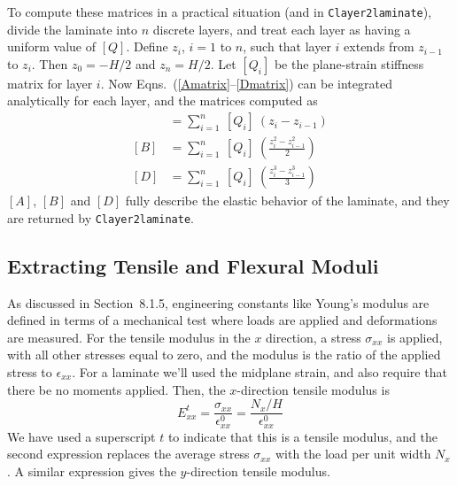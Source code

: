 \documentclass[11pt]{article}
\begin{document}
To compute these matrices in a practical situation (and in \texttt{Clayer2laminate}), divide the laminate into $n$ discrete layers, and treat each layer as having a uniform value of $[Q]$.  Define $z_i$, $i = 1$ to $n$, such that layer $i$ extends from $z_{i-1}$ to $z_{i}$.  Then $z_0 = -H/2$ and $z_n = H/2$.  Let $[Q_i]$ be the plane-strain stiffness matrix for layer $i$.  Now Eqns.~(\ref{Amatrix}--\ref{Dmatrix}) can be integrated analytically for each layer, and the matrices computed as
\begin{align}
     [A] &= \sum_{i=1}^n \: [Q_i] \: \left( z_i - z_{i-1} \right)  \label{Asum} \\
     [B] &= \sum_{i=1}^n  \: [Q_i] \: \left( \frac{z^2_i - z^2_{i-1}}{2} \right)  \label{Bsum}  \\
     [D] &= \sum_{i=1}^n  \: [Q_i] \: \left( \frac{z^3_i - z^3_{i-1}}{3} \right)  \label{Dsum}
\end{align}
$[A]$, $[B]$ and $[D]$ fully describe the elastic behavior of the laminate, and they are returned by \texttt{Clayer2laminate}.  

\subsection*{Extracting Tensile and Flexural Moduli}

As discussed in Section~8.1.5, engineering constants like Young's modulus are defined in terms of a mechanical test where loads are applied and deformations are measured.  For the tensile modulus in the $x$ direction, a stress $\sigma_{xx}$ is applied, with all other stresses equal to zero, and the modulus is the ratio of the applied stress to $\epsilon_{xx}$.  For a laminate we'll used the midplane strain, and also require that there be no moments applied.  Then, the $x$-direction tensile modulus is
\begin{equation}
    E^t_{xx} = \frac{\sigma_{xx}}{\epsilon^0_{xx}}   = \frac{N_{x}/H}{\epsilon^0_{xx}} 
    \label{EtensileDef}
 \end{equation}
We have used a superscript $t$ to indicate that this is a tensile modulus, and the second expression replaces the average stress $\sigma_{xx}$ with the load per unit width $N_x$.  A similar expression gives the $y$-direction tensile modulus.
\end{document}
